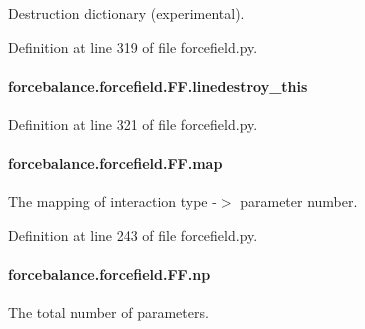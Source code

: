 Destruction dictionary (experimental). 



Definition at line 319 of file forcefield.\-py.

\hypertarget{classforcebalance_1_1forcefield_1_1FF_ab2ca57079cb49527775d044a2b2db6db}{
\paragraph[{linedestroy\-\_\-this}]{\setlength{\rightskip}{0pt plus 5cm}forcebalance.\-forcefield.\-F\-F.\-linedestroy\-\_\-this}}\label{classforcebalance_1_1forcefield_1_1FF_ab2ca57079cb49527775d044a2b2db6db}


Definition at line 321 of file forcefield.\-py.

\hypertarget{classforcebalance_1_1forcefield_1_1FF_adac6add3391d052c319902ccc8e0a617}{
\paragraph[{map}]{\setlength{\rightskip}{0pt plus 5cm}forcebalance.\-forcefield.\-F\-F.\-map}}\label{classforcebalance_1_1forcefield_1_1FF_adac6add3391d052c319902ccc8e0a617}


The mapping of interaction type -\/$>$ parameter number. 



Definition at line 243 of file forcefield.\-py.

\hypertarget{classforcebalance_1_1forcefield_1_1FF_a19eb80acc94a49f9ff806f13a95fef66}{
\paragraph[{np}]{\setlength{\rightskip}{0pt plus 5cm}forcebalance.\-forcefield.\-F\-F.\-np}}\label{classforcebalance_1_1forcefield_1_1FF_a19eb80acc94a49f9ff806f13a95fef66}


The total number of parameters. 



